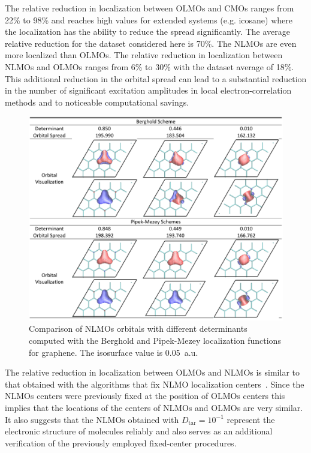 \documentclass[aps,prl,reprint,amsmath,amssymb]{revtex4-1}
\begin{document}
%

The relative reduction in localization between OLMOs and CMOs ranges from 22\% to 98\% and reaches high values for extended systems (e.g. icosane) where the localization has the ability to reduce the spread significantly. The average relative reduction for the dataset considered here is 70\%. The NLMOs are even more localized than OLMOs. The relative reduction in localization between NLMOs and OLMOs ranges from 6\% to 30\% with the dataset average of 18\%. This additional reduction in the orbital spread can lead to a substantial reduction in the number of significant excitation amplitudes in local electron-correlation methods and to noticeable computational savings.
%
\begin{figure}[htbp]
\centering
\includegraphics[width=\textwidth]{graphene_table.pdf}
\caption{Comparison of NLMOs orbitals with different determinants computed with the Berghold and Pipek-Mezey localization functions for graphene. The isosurface value is 0.05~a.u.}
\label{fig:graphene_table}
\end{figure}
%

The relative reduction in localization between OLMOs and NLMOs is similar to that obtained with the algorithms that fix NLMO localization centers~\cite{feng2004An_efficient, cui2010efficient}. 
Since the NLMOs centers were previously fixed at the position of OLMOs centers this implies that the locations of the centers of NLMOs and OLMOs are very similar. It also suggests that the NLMOs obtained with $D_{\text{tar}}=10^{-1}$ represent the electronic structure of molecules reliably and also serves as an additional verification of the previously employed fixed-center procedures. 
\end{document}
